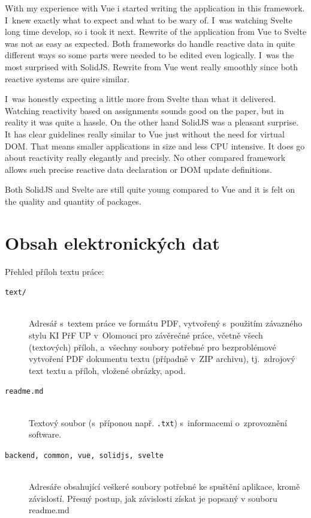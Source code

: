 \documentclass[
  master,
  program=ainf,
  tables=false,
  sourcecodes,
  glossaries,
  index
]{kidiplom}
\begin{document}
\begin{kiconclusions}[english]
  With my experience with Vue i started writing the application in this framework. I~knew exactly what to expect and 
  what to be wary of. I~was watching Svelte long time develop, so i took it next. Rewrite of the application from Vue 
  to Svelte was not as easy as expected. Both frameworks do handle reactive data in quite different ways so some parts
  were needed to be edited even logically. I~was the most surprised with SolidJS. Rewrite from Vue went really smoothly
  since both reactive systems are quire similar.

  I~was honestly expecting a little more from Svelte than what it delivered. Watching reactivity based on assignments
  sounds good on the paper, but in reality it was quite a hassle. On the other hand SolidJS was a pleasant surprise. 
  It has clear guidelines really similar to Vue just without the need for virtual DOM. That means smaller applications
  in size and less CPU intensive. It does go about reactivity really elegantly and precisly. No other compared framework
  allows such precise reactive data declaration or DOM update definitions.

  Both SolidJS and Svelte are still quite young compared to Vue and it is felt on the quality and quantity of packages.
\end{kiconclusions}

\appendix

\section{Obsah elektronických dat} \label{sec:ObsahData}

Přehled příloh textu práce:

\begin{description}

  \item[\texttt{text/}] \hfill \\
    Adresář s~textem práce ve formátu PDF, vytvořený s~použitím
    závazného stylu KI PřF UP v~Olomouci pro závěrečné práce, včetně
    všech (textových) příloh, a~všechny soubory potřebné pro
    bezproblémové vytvoření PDF dokumentu textu (případně v~ZIP
    archivu), tj.~zdrojový text textu a příloh, vložené obrázky, apod.

  \item[\texttt{readme.md}] \hfill \\
    Textový soubor (s~příponou např. \texttt{.txt}) s~informacemi
    o~zprovoznění software.

  \item[\texttt{backend, common, vue, solidjs, svelte}] \hfill \\
    Adresáře obsahující veškeré soubory potřebné ke spuštění aplikace, kromě závislostí.
    Přesný postup, jak závislosti získat je popsaný v souboru readme.md

\end{description}
\end{document}
